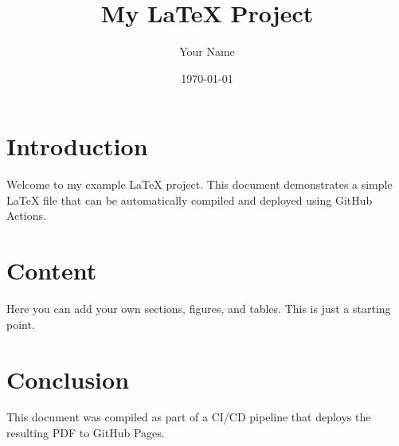 \documentclass{article}
\title{My LaTeX Project}
\author{Your Name}
\date{\today}
\begin{document}
\maketitle

\section{Introduction}

Welcome to my example LaTeX project. This document demonstrates a simple LaTeX file that can be automatically compiled and deployed using GitHub Actions.

\section{Content}

Here you can add your own sections, figures, and tables. This is just a starting point.

\section{Conclusion}

This document was compiled as part of a CI/CD pipeline that deploys the resulting PDF to GitHub Pages.
\end{document}
